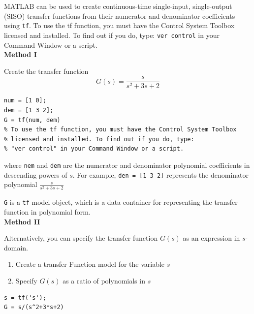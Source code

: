 \documentclass[12pt,letter]{article}
\begin{document}
MATLAB can be used to create continuous-time single-input, single-output (SISO) transfer functions from their numerator and denominator coefficients using \texttt{tf}. To use the tf function, you must have the Control System Toolbox licensed and installed. To find out if you do, type: \texttt{ver control} in your Command Window or a script. \\

\noindent \textbf{Method I}

Create the transfer function 
\begin{equation}
G(s) = \frac{s}{s^2 + 3s + 2}
\end{equation}


\lstset{linewidth=5.8in}
\begin{minipage}{1\textwidth}
  \begin{center}
\begin{lstlisting}
num = [1 0];
dem = [1 3 2];
G = tf(num, dem) 
% To use the tf function, you must have the Control System Toolbox
% licensed and installed. To find out if you do, type: 
% "ver control" in your Command Window or a script.  
\end{lstlisting}
  \end{center}
\end{minipage}
where \texttt{nem} and \texttt{dem} are the numerator and denominator polynomial coefficients in descending powers of $s$. For example, \texttt{den = [1 3 2]} represents the denominator polynomial $\frac{s}{s^2 + 3s + 2}$

\texttt{G} is a \texttt{tf} model object, which is a data container for representing the transfer function in polynomial form. \\


\noindent \textbf{Method II}

Alternatively, you can specify the transfer function $G(s)$ as an expression in $s$-domain.
\begin{enumerate}[noitemsep,topsep=0pt]
\item Create a transfer Function model for the variable $s$
\item Specify $G(s)$ as a ratio of polynomials in $s$
\end{enumerate}

\lstset{linewidth=5.8in}
\begin{minipage}{1\textwidth}
  \begin{center}
\begin{lstlisting}
s = tf('s');
G = s/(s^2+3*s+2)
\end{lstlisting}
  \end{center}
\end{minipage}
\end{document}
